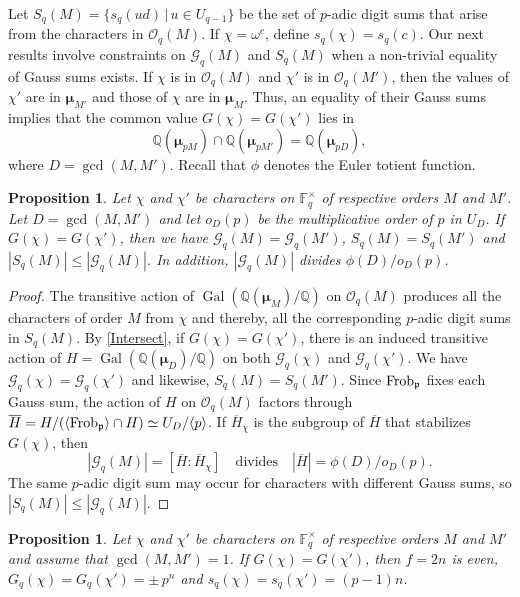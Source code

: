 \documentclass[12pt]{amsart}  \usepackage{amsmath,amssymb,enumerate,amscd,tikz,url}
\numberwithin{equation}{section}
\newtheorem{prop}[equation]{Proposition}
\theoremstyle{definition}
\newcommand{\F}{{\mathbb F}}
\newcommand{\Q}{{\mathbb Q}}
\newcommand{\Mu}{\boldsymbol \mu}
\newcommand{\gp}{{\mathfrak p}}
\newcommand{\cG}{{\mathcal G}}
\newcommand{\cO}{{\mathcal O}}
\newcommand{\Gal}{\operatorname{Gal}}
\newcommand{\Frob}{{\rm Frob}}
\newcommand{\lr}[1]{{\langle {#1} \rangle}}
\newcommand{\vv}[1]{{\left\vert {#1} \right\vert}}
\newcommand{\ov}[1]{\overline{#1}}
\newcommand{\fdeg}[2]{[{#1}\!:\!{#2}]}
\begin{document}
Let $S_q(M) =  \{ s_q(ud) \, \vert \, u \in U_{q-1} \}$ be the set of $p$-adic digit sums that arise from the characters in $\cO_q(M)$.  If $\chi = \omega^c$, define $s_q(\chi) = s_q(c)$.  Our next results involve constraints on $\cG_q(M)$ and $S_q(M)$ when a non-trivial equality of Gauss sums exists.  If $\chi$ is in $\cO_q(M)$ and $\chi'$ is in $\cO_q(M')$, then the values of $\chi'$ are in $\Mu_{M'}$ and those of $\chi$ are in $\Mu_M$.  Thus, an equality of their Gauss sums implies that the common value $G(\chi) = G(\chi')$ lies in 
\begin{equation} \label{Intersect}
\Q(\Mu_{pM}) \cap \Q(\Mu_{pM'}) = \Q(\Mu_{pD}),
\end{equation}
where $D = \gcd(M,M')$.  Recall that $\phi$ denotes the Euler totient function.


\begin{prop} \label{S(M)}
Let $\chi$ and $\chi'$ be characters on $\F_q^\times$ of respective orders $M$ and $M'$.   Let $D = \gcd(M,M')$ and let $o_D(p)$ be the multiplicative order of $p$ in $U_D$.  If  $G(\chi) = G(\chi')$, then we have $\cG_q(M) = \cG_q(M')$, $S_q(M) = S_q(M')$ and $\vv{S_q(M)} \le \vv{\cG_q(M)}$.  In addition, $\vv{\cG_q(M)}$ divides $\phi(D)/o_D(p)$.
\end{prop}

\begin{proof}
The transitive action of $\Gal(\Q(\Mu_M)/\Q)$ on $\cO_q(M)$ produces all the characters of order $M$ from $\chi$ and thereby, all the corresponding $p$-adic digit sums in $S_q(M)$.  By \eqref{Intersect}, if $G(\chi) = G(\chi')$, there is an induced transitive action of $H = \Gal(\Q(\Mu_D)/\Q)$ on both $\cG_q(\chi)$ and $\cG_q(\chi')$.  We have $\cG_q(\chi) = \cG_q(\chi')$ and likewise, $S_q(M) = S_q(M')$.  Since $\Frob_\gp$ fixes each Gauss sum, the action of $H$ on $\cO_q(M)$ factors through $\ov{H} = H/(\lr{\Frob_\gp} \cap H) \simeq U_D/\lr{p}$.  If $\ov{H}_\chi$ is the subgroup of $\ov{H}$ that stabilizes $G(\chi)$, then 
$$
\vv{\cG_q(M)} = \fdeg{\ov{H}}{\ov{H}_\chi}  \quad \text{divides} \quad \vv{\ov{H}} = \phi(D)/o_D(p).
$$
The same $p$-adic digit sum may occur for characters with different Gauss sums, so $\vv{S_q(M)} \le \vv{\cG_q(M)}$.
\end{proof}


\begin{prop} \label{gcdProp}
Let $\chi$ and $\chi'$ be characters on $\F_q^\times$ of respective orders $M$ and $M'$ and assume that $\gcd(M,M') = 1$.  If  $G(\chi) = G(\chi')$, then $f = 2n$ is even, $G_q(\chi) = G_q(\chi') = \pm \,  p^n$ and $s_q(\chi) = s_q(\chi') =  (p-1)n$.
\end{prop}
\end{document}
